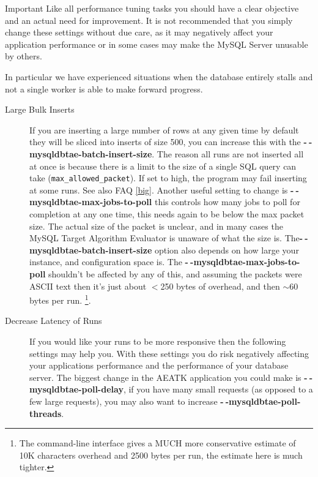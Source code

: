 \documentclass[11pt,letterpaper,oneside]{article}
\begin{document}
\begin{bclogo}[logo=\bcattention, couleurBarre=red, noborder=true]{Important}
Like all performance tuning tasks you should have a clear objective and an actual need for improvement. It is not recommended that you simply change these settings without due care, as it may negatively affect your application performance or in some cases may make the MySQL Server unusable by others.

In particular we have experienced situations when the database entirely stalls and not a single worker is able to make forward progress.
 
\end{bclogo}

\begin{description}

\item[Large Bulk Inserts] If you are inserting a large number of rows at any given time by default they will be sliced into inserts of size 500, you can increase this with the \textbf{-$~\!$-mysqldbtae-batch-insert-size}. The reason all runs are not inserted all at once is because there is a limit to the size of a single SQL query can take (\texttt{max\_allowed\_packet}). If set to high, the program may fail inserting at some runs. See also FAQ \ref{big}. Another useful setting to change is \textbf{-$~\!$-mysqldbtae-max-jobs-to-poll} this controls how many jobs to poll for completion at any one time, this needs again to be below the max packet size. The actual size of the packet is unclear, and in many cases the MySQL Target Algorithm Evaluator is unaware of what the size is. The\textbf{-$~\!$-mysqldbtae-batch-insert-size} option also depends on how large your instance, and configuration space is. The \textbf{-$~\!$-mysqldbtae-max-jobs-to-poll} shouldn't be affected by any of this, and assuming the packets were ASCII text then it's just about $<$250 bytes of overhead, and then $\sim$60 bytes per run. \footnote{The command-line interface gives a MUCH more conservative estimate of 10K characters overhead and 2500 bytes per run, the estimate here is much tighter.}.

\item[Decrease Latency of Runs] If you would like your runs to be more responsive then the following settings may help you. With these settings you do risk negatively affecting your applications performance and the performance of your database server. The biggest change in the AEATK application you could make is \textbf{-$~\!$-mysqldbtae-poll-delay}, if you have many small requests (as opposed to a few large requests), you may also want to increase \textbf{-$~\!$-mysqldbtae-poll-threads}. 


\end{description}
\end{document}
